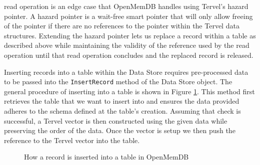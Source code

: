 \documentclass[letter,11pt]{article}
\let\oldReturn\Return
\renewcommand{\Return}{\State\oldReturn}
\newcommand{\inlinecode}[1]{\colorbox{codegrey}{\lstinline[language=C++]{#1}}}
\begin{document}
read operation is an edge case that OpenMemDB handles using Tervel's hazard pointer. A 
hazard pointer is a wait-free smart pointer that will only allow freeing of the pointer 
if there are no references to the pointer within the Tervel data structures. Extending 
the hazard pointer lets us replace a record within a table as described above while 
maintaining the validity of the reference used by the read operation until that read 
operation concludes and the replaced record is released.
\par\vspace{\baselineskip}
Inserting records into a table within the Data Store requires pre-processed data to be passed
into the \inlinecode{InsertRecord} method of the Data Store object. The general procedure of inserting
into a table is shown in Figure \ref{insert_record}. This method first retrieves the table 
that we want to insert into and ensures the data provided adheres to the schema defined 
at the table's creation. Assuming that check is successful, a Tervel vector is then 
constructed using the given data while preserving the order of the data. Once the vector 
is setup we then push the reference to the Tervel vector into the table.

\begin{figure}
 \begin{algorithmic}
 \EndIf
  \State{}
 \EndFor
 \State{}
 \EndFunction
 \end{algorithmic}
 \caption{How a record is inserted into a table in OpenMemDB}
 \label{insert_record}
\end{figure}
\end{document}

